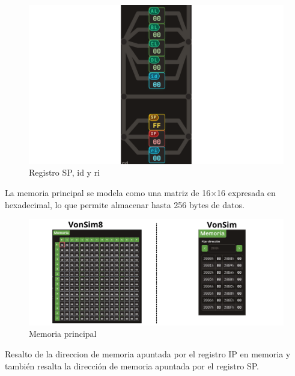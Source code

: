 \documentclass[12pt,oneside]{templates/unerthesis}
\begin{document}
\begin{figure}

{\centering \includegraphics[width=1\linewidth]{images/idrisp} 

}

\caption{Registro SP, id y ri}\label{fig:idrisp}
\end{figure}

La memoria principal se modela como una matriz de 16×16 expresada en hexadecimal, lo que permite almacenar hasta 256 bytes de datos.

\begin{figure}

{\centering \includegraphics[width=1\linewidth]{images/memoriacomp} 

}

\caption{Memoria principal}\label{fig:memoriacomp}
\end{figure}

Resalto de la direccion de memoria apuntada por el registro IP en memoria y también resalta la dirección de memoria apuntada por el registro SP.
\end{document}
